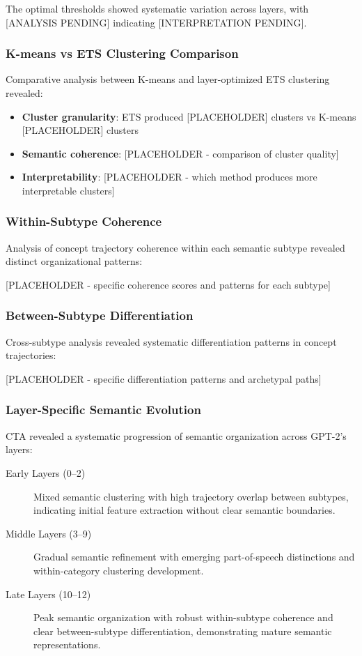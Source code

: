 The optimal thresholds showed systematic variation across layers, with [ANALYSIS PENDING] indicating [INTERPRETATION PENDING].

\subsubsection{K-means vs ETS Clustering Comparison}

Comparative analysis between K-means and layer-optimized ETS clustering revealed:

\begin{itemize}
    \item \textbf{Cluster granularity}: ETS produced [PLACEHOLDER] clusters vs K-means [PLACEHOLDER] clusters
    \item \textbf{Semantic coherence}: [PLACEHOLDER - comparison of cluster quality]
    \item \textbf{Interpretability}: [PLACEHOLDER - which method produces more interpretable clusters]
\end{itemize}

\subsubsection{Within-Subtype Coherence}

Analysis of concept trajectory coherence within each semantic subtype revealed distinct organizational patterns:

[PLACEHOLDER - specific coherence scores and patterns for each subtype]

\subsubsection{Between-Subtype Differentiation}

Cross-subtype analysis revealed systematic differentiation patterns in concept trajectories:

[PLACEHOLDER - specific differentiation patterns and archetypal paths]

\subsubsection{Layer-Specific Semantic Evolution}

CTA revealed a systematic progression of semantic organization across GPT-2's layers:

\begin{description}
    \item[Early Layers (0--2)] Mixed semantic clustering with high trajectory overlap between subtypes, indicating initial feature extraction without clear semantic boundaries.
    
    \item[Middle Layers (3--9)] Gradual semantic refinement with emerging part-of-speech distinctions and within-category clustering development.
    
    \item[Late Layers (10--12)] Peak semantic organization with robust within-subtype coherence and clear between-subtype differentiation, demonstrating mature semantic representations.
\end{description}

